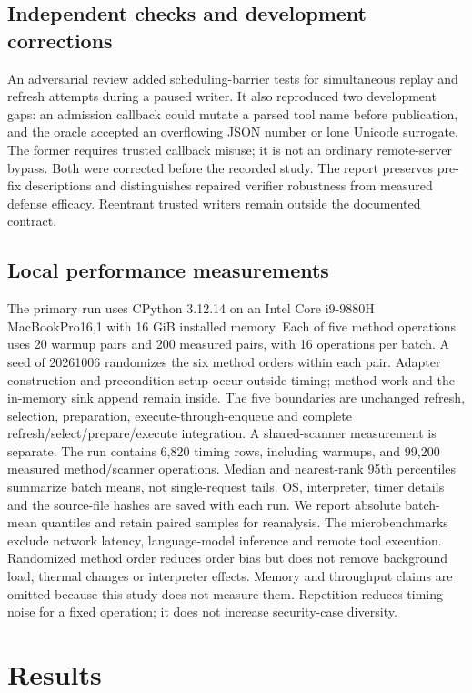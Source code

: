 \subsection{Independent checks and development corrections}
An adversarial review added scheduling-barrier tests for simultaneous replay and
refresh attempts during a paused writer. It also reproduced two development gaps:
an admission callback could mutate a parsed tool name before publication, and the
oracle accepted an overflowing JSON number or lone Unicode surrogate. The former
requires trusted callback misuse; it is not an ordinary remote-server bypass.
Both were corrected before the recorded study. The report preserves pre-fix
descriptions and distinguishes repaired verifier robustness from measured defense
efficacy. Reentrant trusted writers remain outside the documented contract.

\subsection{Local performance measurements}
The primary run uses CPython 3.12.14 on an Intel Core i9-9880H MacBookPro16,1 with 16 GiB installed memory. Each of five method operations uses 20 warmup pairs and 200 measured pairs, with 16 operations per batch. A seed of 20261006 randomizes the six method orders within each pair. Adapter construction and precondition setup occur outside timing; method work and the in-memory sink append remain inside. The five boundaries are unchanged refresh, selection, preparation, execute-through-enqueue and complete refresh/select/prepare/execute integration. A shared-scanner measurement is separate. The run contains 6,820 timing rows, including warmups, and 99,200 measured method/scanner operations. Median and nearest-rank 95th percentiles summarize batch means, not single-request tails. OS, interpreter, timer details and the source-file hashes are saved with each run.
We report absolute batch-mean quantiles and retain paired samples for reanalysis.
The microbenchmarks exclude network latency, language-model inference and remote
tool execution. Randomized method order reduces order bias but does not remove
background load, thermal changes or interpreter effects. Memory and throughput
claims are omitted because this study does not measure them. Repetition reduces
timing noise for a fixed operation; it does not increase security-case diversity.

\section{Results}
